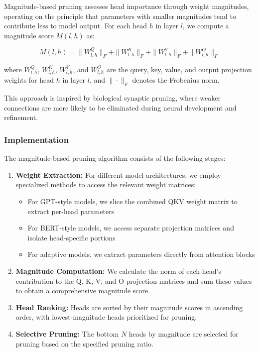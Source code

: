 Magnitude-based pruning assesses head importance through weight magnitudes, operating on the principle that parameters with smaller magnitudes tend to contribute less to model output. For each head $h$ in layer $l$, we compute a magnitude score $M(l,h)$ as:

\begin{equation}
M(l,h) = \|W^Q_{l,h}\|_F + \|W^K_{l,h}\|_F + \|W^V_{l,h}\|_F + \|W^O_{l,h}\|_F
\end{equation}

where $W^Q_{l,h}$, $W^K_{l,h}$, $W^V_{l,h}$, and $W^O_{l,h}$ are the query, key, value, and output projection weights for head $h$ in layer $l$, and $\|\cdot\|_F$ denotes the Frobenius norm.

This approach is inspired by biological synaptic pruning, where weaker connections are more likely to be eliminated during neural development and refinement.

\subsubsection{Implementation}

The magnitude-based pruning algorithm consists of the following stages:

\begin{enumerate}
    \item \textbf{Weight Extraction:} For different model architectures, we employ specialized methods to access the relevant weight matrices:
    
    \begin{itemize}
        \item For GPT-style models, we slice the combined QKV weight matrix to extract per-head parameters
        \item For BERT-style models, we access separate projection matrices and isolate head-specific portions
        \item For adaptive models, we extract parameters directly from attention blocks
    \end{itemize}
    
    \item \textbf{Magnitude Computation:} We calculate the norm of each head's contribution to the Q, K, V, and O projection matrices and sum these values to obtain a comprehensive magnitude score.
    
    \item \textbf{Head Ranking:} Heads are sorted by their magnitude scores in ascending order, with lowest-magnitude heads prioritized for pruning.
    
    \item \textbf{Selective Pruning:} The bottom $N$ heads by magnitude are selected for pruning based on the specified pruning ratio.
\end{enumerate}

